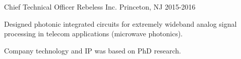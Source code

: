 \begin{cventries}
  \cventry
    {Chief Technical Officer} %
    {Rebeless Inc.}
    {Princeton, NJ} %
    {2015-2016} %
    {
      \begin{cvitems} %
        \item {Designed photonic integrated circuits for extremely wideband analog signal processing in telecom applications (microwave photonics).}
        \item {Company technology and IP was based on PhD research.}
      \end{cvitems}
    }

\end{cventries}
